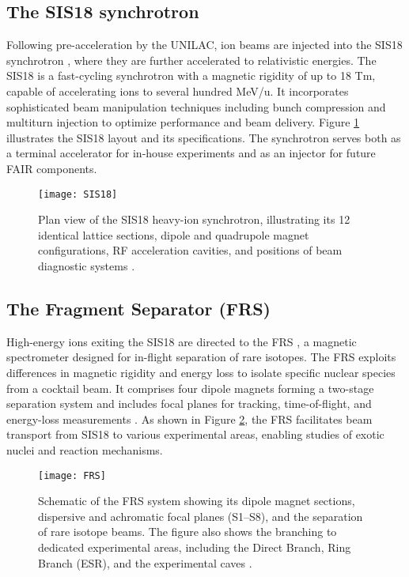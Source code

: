 \subsection{The SIS18 synchrotron}

Following pre-acceleration by the UNILAC, ion beams are injected into the SIS18 synchrotron \cite{singh2014tune}, where they are further accelerated to relativistic energies. The SIS18 is a fast-cycling synchrotron with a magnetic rigidity of up to 18 Tm, capable of accelerating ions to several hundred MeV/u. It incorporates sophisticated beam manipulation techniques including bunch compression and multiturn injection to optimize performance and beam delivery. Figure \ref{fig:SIS18} illustrates the SIS18 layout and its specifications. The synchrotron serves both as a terminal accelerator for in-house experiments and as an injector for future \gls{FAIR} components.

\begin{figure}
	\centering
	\texttt{[image: SIS18]}
	\caption[Plan view of the SIS18 heavy-ion synchrotron]{Plan view of the SIS18 heavy-ion synchrotron, illustrating its 12 identical lattice sections, dipole and quadrupole magnet configurations, RF acceleration cavities, and positions of beam diagnostic systems \cite{gsiSIS18Sections}.}
	\label{fig:SIS18}
\end{figure}

\subsection{The Fragment Separator (FRS)}

High-energy ions exiting the SIS18 are directed to the \gls{FRS} \cite{geissel_experiments_2008}, a magnetic spectrometer designed for in-flight separation of rare isotopes. The \gls{FRS} exploits differences in magnetic rigidity and energy loss to isolate specific nuclear species from a cocktail beam. It comprises four dipole magnets forming a two-stage separation system and includes focal planes for tracking, time-of-flight, and energy-loss measurements . As shown in Figure \ref{fig:FRS}, the \gls{FRS} facilitates beam transport from SIS18 to various experimental areas, enabling studies of exotic nuclei and reaction mechanisms.


\begin{figure}
	\texttt{[image: FRS]}
	\caption[Schematic of the FRS system and beam branches]{Schematic of the \gls{FRS} system showing its dipole magnet sections, dispersive and achromatic focal planes (S1–S8), and the separation of rare isotope beams. The figure also shows the branching to dedicated experimental areas, including the Direct Branch, Ring Branch (ESR), and the experimental caves \cite{gsiWebHomelt}.}
	\label{fig:FRS}
\end{figure}


